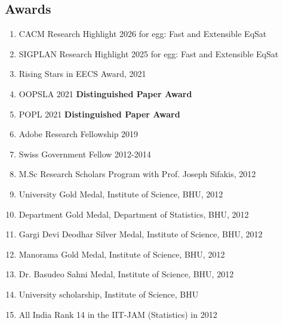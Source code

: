 \documentclass[margin, 10pt]{res} %
\begin{document}
\begin{resume}
\section{Awards}
\begin{enumerate}[itemsep=.5pt]
\item CACM Research Highlight 2026 for egg: Fast and Extensible EqSat
\item SIGPLAN Research Highlight 2025 for egg: Fast and Extensible EqSat
\item Rising Stars in EECS Award, 2021
\item OOPSLA 2021 \textbf{Distinguished Paper Award}
\item POPL 2021 \textbf{Distinguished Paper Award}
\item Adobe Research Fellowship 2019
\item Swiss Government Fellow 2012-2014
\item M.Sc Research Scholars Program with Prof. Joseph Sifakis, 2012
\item University Gold Medal, Institute of Science, BHU, 2012
\item Department Gold Medal, Department of Statistics, BHU, 2012
\item Gargi Devi Deodhar Silver Medal, Institute of Science, BHU, 2012
\item Manorama Gold Medal, Institute of Science, BHU, 2012
\item Dr. Basudeo Sahni Medal, Institute of Science, BHU, 2012
\item University scholarship, Institute of Science, BHU
\item All India Rank 14 in the IIT-JAM (Statistics) in 2012
\end{enumerate}


\end{resume}
\end{document}
